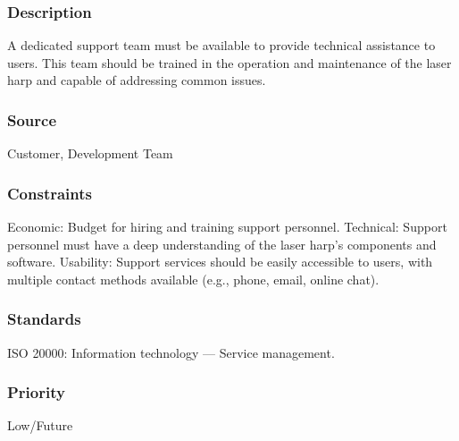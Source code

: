 \subsubsection{Description}
A dedicated support team must be available to provide technical assistance to users. This team should be trained in the operation and maintenance of the laser harp and capable of addressing common issues.
\subsubsection{Source}
Customer, Development Team
\subsubsection{Constraints}Economic: Budget for hiring and training support personnel.
Technical: Support personnel must have a deep understanding of the laser harp's components and software.
Usability: Support services should be easily accessible to users, with multiple contact methods available (e.g., phone, email, online chat).
\subsubsection{Standards}
ISO 20000: Information technology — Service management.
\subsubsection{Priority}
Low/Future
